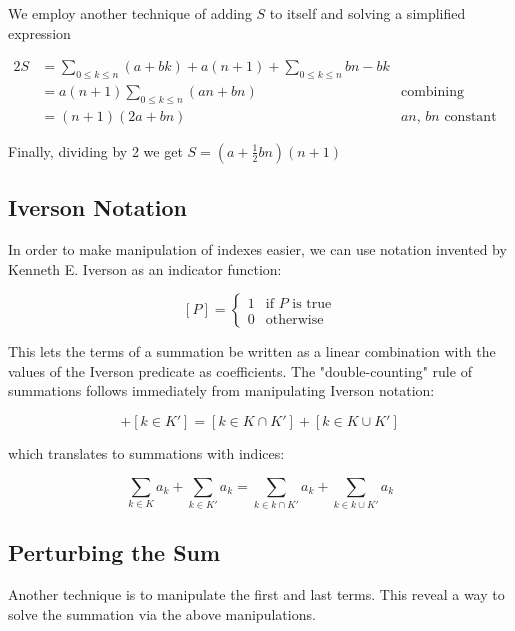 \documentclass{standalone}
\begin{document}
We employ another technique of adding $S$ to itself and solving a simplified expression

\begin{align*}
  2S &= \sum_{0 \leqslant k \leqslant n} (a + bk) + a(n+1) + \sum_{0 \leqslant k \leqslant n} bn - bk \\
  &= a(n+1) \sum_{0 \leqslant k \leqslant n} (an + bn) &\text{combining summations and simplifying} \\
  &= (n+1)(2a + bn) &\text{$an$, $bn$ constant}
\end{align*}

Finally, dividing by 2 we get $S = (a + \frac 1 2 bn)(n+1)$

\subsection{Iverson Notation}

In order to make manipulation of indexes easier, we can use notation invented
by Kenneth E. Iverson as an indicator function:

\begin{equation*} \label{eqn:iverson}
[P] =
\begin{cases}
  1 & \text{if $P$ is true} \\
  0 & \text{otherwise}
\end{cases}
\end{equation*}

This lets the terms of a summation be written as a linear combination with the
values of the Iverson predicate as coefficients. The "double-counting" rule of
summations follows immediately from manipulating Iverson notation:

\begin{equation*}
  [k \in K] + [k \in K'] = [k \in K \cap K'] + [k \in K \cup K']
\end{equation*}

which translates to summations with indices:

\begin{equation*}
  \sum_{k \in K} a_k + \sum_{k \in K'} a_k = \sum_{k \in k \cap K'} a_k + \sum_{k \in k \cup K'} a_k
\end{equation*}

\subsection{Perturbing the Sum}

Another technique is to manipulate the first and last terms. This reveal a way
to solve the summation via the above manipulations.
\end{document}
